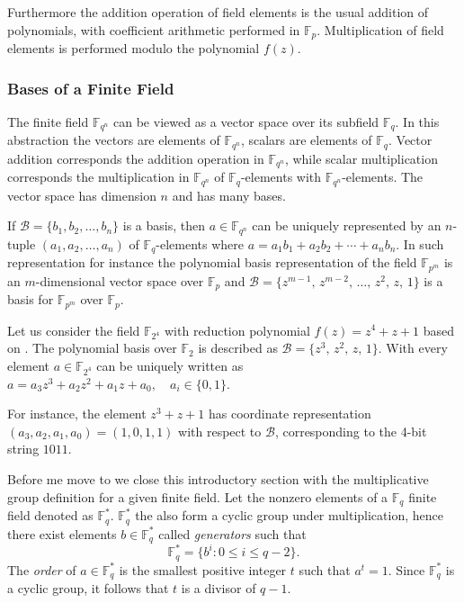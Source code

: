 Furthermore the addition operation of field elements is the usual addition of polynomials, with coefficient arithmetic
performed in $\mathbb{F}_p$. Multiplication of field elements is performed modulo the polynomial $f(z)$. 
\subsubsection{Bases of a Finite Field}
\label{sssec:ch01.basesFiniteField}

The finite field $\mathbb{F}_{q^n}$ can be viewed as a vector space over its subfield $\mathbb{F}_q$. In this abstraction the  vectors are elements of $\mathbb{F}_{q^n}$, scalars are elements of $\mathbb{F}_q$.  Vector addition corresponds the addition operation in $\mathbb{F}_{q^n}$, while scalar multiplication  corresponds the multiplication in $\mathbb{F}_{q^n}$ of $\mathbb{F}_q$-elements with $\mathbb{F}_{q^n}$-elements.
The vector space has dimension $n$ and has many bases.

If $\mathcal{B} = \{b_1, b_2, \ldots, b_n\}$ is a basis, then $a \in \mathbb{F}_{q^n}$ can be uniquely represented
by an $n$-tuple $(a_1, a_2, \ldots, a_n)$ of $\mathbb{F}_q$-elements where $a = a_1 b_1 + a_2 b_2 + \cdots + a_n b_n$.
In such representation for instance the polynomial basis representation of the field $\mathbb{F}_{p^m}$ is an $m$-dimensional vector space over $\mathbb{F}_p$ and $\mathcal{B} = \{z^{m-1},\, z^{m-2},\, \ldots,\, z^2,\, z,\, 1\}$
is a basis for $\mathbb{F}_{p^m}$ over $\mathbb{F}_p$.

\begin{example}
	\label{ex:ch01.polynomialBasisF24}
	Let us consider the field $\mathbb{F}_{2^4}$ with reduction polynomial $f(z) = z^4 + z + 1$ based on \cite{menezes2004ECC}.
	The polynomial basis over $\mathbb{F}_2$ is described as $\mathcal{B} = \{z^3,\, z^2,\, z,\, 1\}$.  With every element $a \in \mathbb{F}_{2^4}$ can be uniquely written as  $	a = a_3 z^3 + a_2 z^2 + a_1 z + a_0, \quad a_i \in \{0, 1\}$.
	
	For instance, the element $z^3 + z + 1$ has coordinate representation $(a_3, a_2, a_1, a_0) = (1, 0, 1, 1)$
	with respect to $\mathcal{B}$, corresponding to the 4-bit string $1011$.
\end{example}

Before me move to  we close this introductory section with the  multiplicative group definition for a given finite field.  Let the nonzero elements of a $\mathbb{F}_q$ finite field  denoted as $\mathbb{F}_q^*$.  $\mathbb{F}_q^*$ the also form a cyclic group under multiplication, hence there exist elements $b \in \mathbb{F}_q^*$ called \textit{generators} such that 
\begin{equation}
	\mathbb{F}_q^* = \{ b^i : 0 \leq i \leq q-2 \}.
	\label{eq:ch1.multiplicativeGroup}
\end{equation}
The \textit{order} of $a \in \mathbb{F}_q^*$ is the smallest positive integer $t$ such that $a^t = 1$.
Since $\mathbb{F}_q^*$ is a cyclic group, it follows that $t$ is a divisor of $q - 1$. 

